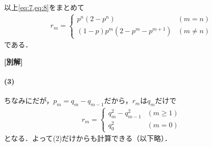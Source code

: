 \documentclass[../../main.tex]{subfiles}
\begin{document}
以上\cref{eq:7,eq:8}をまとめて
\begin{align}
  r_m =
  \begin{cases}
    p^n (2 - p^n) & (m = n) \\
    (1-p)p^m (2 - p^m - p^{m+1}) & (m \neq n)
  \end{cases}
\end{align}
である．

{\bf [別解]}

\paragraph{(3)}

ちなみにだが，$p_m=q_m-q_{m-1}$だから，$r_m$は$q_m$だけで
\begin{align}
  r_m =
  \begin{cases}
    q_m^2 - q_{m-1}^2 & (m \ge 1) \\
    q_0^2 & (m = 0)
  \end{cases}
\end{align}
となる．よって(2)だけからも計算できる（以下略）．
\end{document}
